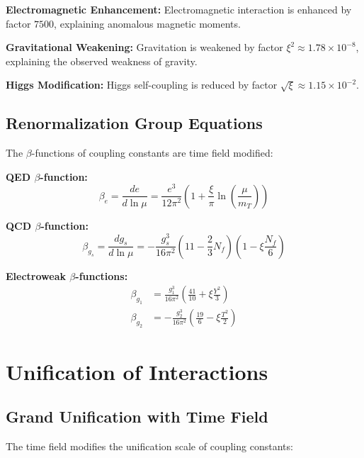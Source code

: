 \documentclass[12pt,a4paper]{report}
\newcommand{\xipar}{\xi}      %
\begin{document}
	\textbf{Electromagnetic Enhancement:}
	Electromagnetic interaction is enhanced by factor $7500$, explaining anomalous magnetic moments.
	
	\textbf{Gravitational Weakening:}
	Gravitation is weakened by factor $\xipar^2 \approx 1.78 \times 10^{-8}$, explaining the observed weakness of gravity.
	
	\textbf{Higgs Modification:}
	Higgs self-coupling is reduced by factor $\sqrt{\xipar} \approx 1.15 \times 10^{-2}$.
	
	\subsection{Renormalization Group Equations}\label{subsec:renormalization_group}
	
	The $\beta$-functions of coupling constants are time field modified:
	
	\textbf{QED $\beta$-function:}
	\begin{equation}
		\beta_e = \frac{de}{d\ln\mu} = \frac{e^3}{12\pi^2} \left(1 + \frac{\xipar}{\pi} \ln\left(\frac{\mu}{m_T}\right)\right)
	\end{equation}
	
	\textbf{QCD $\beta$-function:}
	\begin{equation}
		\beta_{g_s} = \frac{dg_s}{d\ln\mu} = -\frac{g_s^3}{16\pi^2} \left(11 - \frac{2}{3} N_f\right) \left(1 - \xipar \frac{N_f}{6}\right)
	\end{equation}
	
	\textbf{Electroweak $\beta$-functions:}
	\begin{align}
		\beta_{g_1} &= \frac{g_1^3}{16\pi^2} \left(\frac{41}{10} + \xipar \frac{Y^2}{3}\right) \\
		\beta_{g_2} &= -\frac{g_2^3}{16\pi^2} \left(\frac{19}{6} - \xipar \frac{T^2}{2}\right)
	\end{align}
	
	\section{Unification of Interactions}\label{sec:unification}
	
	\subsection{Grand Unification with Time Field}\label{subsec:grand_unification}
	
	The time field modifies the unification scale of coupling constants:
	
\end{document}
